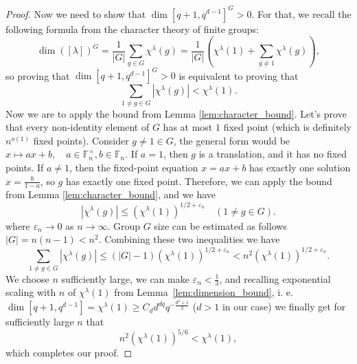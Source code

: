 \documentclass[10pt,twocolumn,superscriptaddress,aps,amsmath,amssymb,citeautoscript,floatfix,prx]{revtex4-2}
\theoremstyle{plain}
\theoremstyle{plain}
\theoremstyle{plain}
\theoremstyle{plain}
\theoremstyle{plain}
\theoremstyle{plain}
\theoremstyle{plain}
\theoremstyle{definition}
\theoremstyle{plain}
\begin{document}
\begin{appendix}
\begin{proof}
Now we need to show that $\dim [q+1, q^{d-1}]^G > 0$. For that, we recall the following formula from the character theory of finite groups:
\[
    \operatorname{dim}\left([\lambda]\right)^G=\frac{1}{|G|} \sum_{g \in G} \chi^\lambda(g)=\frac{1}{|G|}\left(\chi^\lambda(1)+\sum_{g \neq 1}\chi^\lambda(g) \right),
\]
so proving that $\dim [q+1, q^{d-1}]^G > 0$ is equivalent to proving that
\[
    \sum_{1 \neq g \in G}\left|\chi^\lambda(g)\right|<\chi^\lambda(1).
\]
Now we are to apply the bound from Lemma \ref{lem:character_bound}. Let's
prove that every non-identity element of $G$ has at most $1$ fixed point (which is definitely $n^{o(1)}$ fixed points).
Consider $g\neq 1 \in G$, the general form would be $x \mapsto a x+b, \quad a \in \mathbb{F}_n^{\times}, b \in \mathbb{F}_n$. 
If $a=1$, then $g$ is a translation, and it has no fixed points. If $a \neq 1$, then the fixed-point equation $x=a x+b$ has exactly one solution $x=\frac{b}{1-a}$, so $g$ has exactly one fixed point.
Therefore, we can apply the bound from Lemma \ref{lem:character_bound}, and we have
\[
    \left|\chi^\lambda(g)\right| \leq\left(\chi^\lambda(1)\right)^{1 / 2+\varepsilon_n} \quad(1 \neq g \in G) .
\]
where $\varepsilon_n \to 0$ as $n \to \infty$. Group $G$ size can be estimated as follows
$
    |G|=n(n-1)<n^2 .
$
Combining these two inequalities we have
\[
    \sum_{1 \neq g \in G}\left|\chi^\lambda(g)\right| \leq(|G|-1)\left(\chi^\lambda(1)\right)^{1 / 2+\varepsilon_n}<n^2\left(\chi^\lambda(1)\right)^{1 / 2+\varepsilon_n} .
\]
We choose $n$ sufficiently large, we can make $\varepsilon_n<\frac{1}{3}$, and recalling exponential scaling with $n$ 
of $\chi^{\lambda}(1)$ from Lemma~\ref{lem:dimension_bound}, i. e. $\dim \left[q+1, q^{d-1}\right]= \chi^\lambda(1) \geq C_d d^{d q} q^{-\frac{d^2+1}{2}}$ 
($d>1$ in our case) we finally get for sufficiently large $n$ that
\[
    n^2\left(\chi^\lambda(1)\right)^{5 / 6}<\chi^\lambda(1),
\]
which completes our proof.
\end{proof}


\end{appendix}
\end{document}
